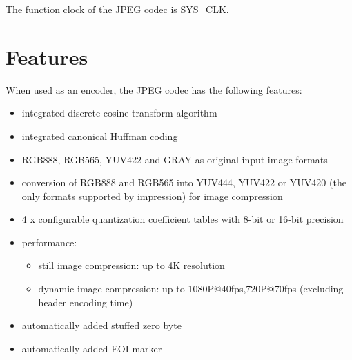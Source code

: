 \documentclass[main\_\_EN.tex]{subfiles}
\begin{document}
The function clock of the JPEG codec is SYS\_CLK.


\section{Features}
\label{sec:jpegcodec-features}

When used as an encoder, the JPEG codec has the following features:
\begin{itemize}
    \item integrated discrete cosine transform algorithm
    \item integrated canonical Huffman coding
    \item RGB888, RGB565, YUV422 and GRAY as original input image formats
    \item conversion of RGB888 and RGB565 into YUV444, YUV422 or YUV420 (the only formats supported by impression) for image compression
    \item 4 x configurable quantization coefficient tables with 8-bit or 16-bit precision
    \item performance:
    \begin{itemize}
        \item still image compression: up to 4K resolution
        \item dynamic image compression: up to 1080P@40fps,720P@70fps (excluding header encoding time)
    \end{itemize}
    \item automatically added stuffed zero byte
    \item automatically added EOI marker
\end{itemize}
\end{document}
